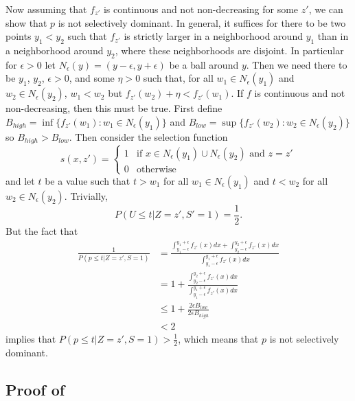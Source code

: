\documentclass{article}
\begin{document}
\begin{appendix}
Now assuming that $f_{z'}$ is continuous and not non-decreasing for some $z'$, we can show that $p$ is not selectively dominant. In general, it suffices for there to be two points $y_1 < y_2$ such that $f_{z'}$ is strictly larger in a neighborhood around $y_1$ than in a neighborhood around $y_2$, where these neighborhoods are disjoint. In particular for $\epsilon > 0$ let $N_{\epsilon}(y) = (y - \epsilon, y + \epsilon )$ be a ball around $y$. Then we need there to be $y_1$, $y_2$, $\epsilon > 0$, and some $\eta > 0$ such that, for all $w_1 \in N_{\epsilon}(y_1)$ and $w_2 \in N_{\epsilon}(y_2)$, $w_1  < w_2$ but $f_{z'}(w_2) + \eta < f_{z'}(w_1) $. If $f$ is continuous and not non-decreasing, then this must be true. First define $B_{high} = \inf \{f_{z'}(w_1): w_1 \in N_{\epsilon}(y_1)\}$ and  $B_{low} = \sup \{f_{z'}(w_2): w_2 \in N_{\epsilon}(y_2)\}$ so $B_{high}  > B_{low}$. Then consider the selection function 
\begin{equation*}
s(x, z')= \begin{cases}
1 &\text{if } x \in N_{\epsilon}(y_1) \cup N_{\epsilon}(y_2) \text{ and } z=z' \\
0 &\text{otherwise }
\end{cases}
\end{equation*}
and let $t$ be a value such that $t > w_1$ for all $w_1 \in N_{\epsilon}(y_1)$ and $t < w_2$ for all $w_2 \in  N_{\epsilon}(y_2)$. Trivially, 
\begin{equation*}
    P(U \leq t | Z = z', S' = 1) = \frac{1}{2}. 
\end{equation*}
But the fact that 
\begin{align*}
    \frac{1}{P(p \leq t | Z=z', S = 1)} &= \frac{ \int_{y_1 - \epsilon}^{y_1 + \epsilon} f_{z'}(x) dx + \int_{y_2 - \epsilon}^{y_2 + \epsilon} f_{z'}(x) dx  }{\int_{y_1 - \epsilon}^{y_1 + \epsilon} f_{z'}(x) dx}\\
    &= 1 + \frac{ \int_{y_2 - \epsilon}^{y_2 + \epsilon} f_{z'}(x) dx  }{\int_{y_1 - \epsilon}^{y_1 + \epsilon} f_{z'}(x) dx}\\
    &\leq 1 + \frac{ 2\epsilon B_{low}  }{2\epsilon B_{high} }\\
    & < 2
\end{align*}
implies that $P(p \leq t |Z=z',  S = 1) > \frac{1}{2} $, which means that $p$ is not selectively dominant. 

\iffalse
\subsection{Proof of }


\end{appendix}
\end{document}
